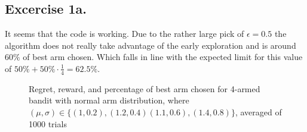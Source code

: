 \documentclass[12pt, a4paper,DIV=12, bibliography=totocnumbered]{scrartcl}
\begin{document}
\subsection{Excercise 1a.}
It seems that the code is working.  Due to the rather large pick of $\epsilon = 0.5$ the algorithm does not really take advantage of the early exploration and 
is around $60\%$ of best arm chosen. Which falls in line with the expected limit for this value of $50\%+50\%\cdot\frac{1}{4}=62.5\%$.
\begin{figure}[h]
\hfill
{}\par
{}
\caption{Regret, reward, and percentage of best arm chosen for 
    4-armed bandit with normal arm distribution, where $(\mu,\sigma)\in\{(1,0.2),(1.2,0.4)(1.1,0.6),(1.4,0.8)\}$, averaged of 1000 trials}
\end{figure}
\end{document}
